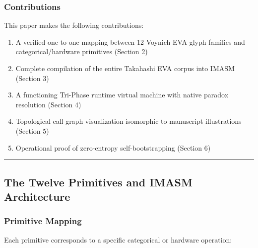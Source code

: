 \documentclass[12pt,a4paper]{article}
\begin{document}
\subsubsection{Contributions}

This paper makes the following contributions:

\begin{enumerate}
    \item A verified one-to-one mapping between 12 Voynich EVA glyph families and categorical/hardware primitives (Section 2)
    \item Complete compilation of the entire Takahashi EVA corpus into IMASM (Section 3)
    \item A functioning Tri-Phase runtime virtual machine with native paradox resolution (Section 4)
    \item Topological call graph visualization isomorphic to manuscript illustrations (Section 5)
    \item Operational proof of zero-entropy self-bootstrapping (Section 6)
\end{enumerate}

\begin{center}
\rule{0.5\textwidth}{0.4pt}
\end{center}

\subsection{The Twelve Primitives and IMASM Architecture}

\subsubsection{Primitive Mapping}

Each primitive corresponds to a specific categorical or hardware operation:
\end{document}
